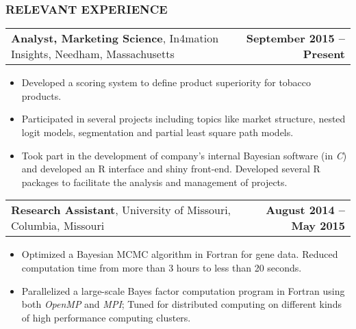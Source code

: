 \documentclass[11pt]{article}
\makeatletter
\newcommand{\headerrow}[2]
{\begin{tabular*}{\linewidth}{l@{\extracolsep{\fill}}r}
	#1 & #2 \\
\end{tabular*}
}
\newcommand{\CPP}
{C\nolinebreak[4]\hspace{-.05em}\raisebox{.22ex}{\footnotesize\bf ++}}
\makeatother
\begin{document}
\subsubsection*{\centering RELEVANT EXPERIENCE}
\vspace{-.3em}

\headerrow
{\textbf{Analyst, Marketing Science}, In4mation Insights, Needham, Massachusetts}
{\textbf{September 2015 – Present}}
\begin{itemize}
    \item Developed a scoring system to define product superiority for tobacco products.
		\item Participated in several projects including topics like market structure, nested logit models, segmentation and partial least square path models.
    \item Took part in the development of company's internal Bayesian software (in \emph{\CPP}) and developed an R interface and shiny front-end. Developed several R packages to facilitate the analysis and management of projects.
\end{itemize}


\noindent\headerrow
{\textbf{Research Assistant}, University of Missouri, Columbia, Missouri}
{\textbf{August 2014 – May 2015}}
\begin{itemize}
	\item Optimized a Bayesian MCMC algorithm in Fortran for gene data. Reduced computation time from more than 3 hours to less than 20 seconds.
	\item Parallelized a large-scale Bayes factor computation program in Fortran using both \emph{OpenMP} and \emph{MPI}; Tuned for distributed computing on different kinds of high performance computing clusters.
\end{itemize}
\end{document}
